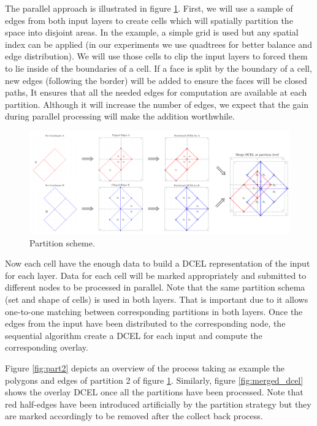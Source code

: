 The parallel approach is illustrated in figure \ref{fig:overlay_parted}.  First, we will use a sample of edges from both input layers to create cells which will spatially partition the space into disjoint areas.  
In the example, a simple grid is used but any spatial index can be applied (in our experiments we use quadtrees for better balance and edge distribution).
We will use those cells to clip the input layers to forced them to lie inside of the boundaries of a cell. 
If a face is split by the boundary of a cell, new edges (following the border) will be added to ensure the faces will be closed paths,
It ensures that all the needed edges for computation are available at each partition. 
Although it will increase the number of edges, we expect that the gain during parallel processing will make the addition worthwhile.

\begin{figure}
    \centering
    \includegraphics[width=\textwidth]{figures/01-OverlayParted}
    \caption{Partition scheme.}\label{fig:overlay_parted}
\end{figure}

Now each cell have the enough data to build a DCEL representation of the input for each layer.  Data for each cell will be marked appropriately and submitted to different nodes to be processed in parallel.  
Note that the same partition schema (set and shape of cells) is used in both layers.  That is important due to it allows one-to-one matching between corresponding partitions in both layers.
Once the edges from the input have been distributed to the corresponding node, the sequential algorithm create a DCEL for each input and compute the corresponding overlay. 

Figure \ref{fig:part2} depicts an overview of the process taking as example the polygons and edges of partition 2 of figure \ref{fig:overlay_parted}.  Similarly, figure \ref{fig:merged_dcel} shows the overlay DCEL once all the partitions have been processed. 
Note that red half-edges have been introduced artificially by the partition strategy but they are marked accordingly to be removed after the collect back process.

